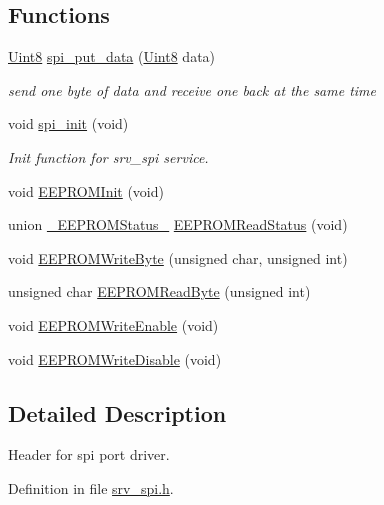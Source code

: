 \subsection*{Functions}
\begin{DoxyCompactItemize}
\item 
\hyperlink{a00070_af84840501dec18061d18a68c162a8fa2}{Uint8} \hyperlink{a00011_a19e2dff580e4d1b2198fa9108fca81ac}{spi\+\_\+put\+\_\+data} (\hyperlink{a00070_af84840501dec18061d18a68c162a8fa2}{Uint8} data)
\begin{DoxyCompactList}\small\item\em send one byte of data and receive one back at the same time \end{DoxyCompactList}\item 
void \hyperlink{a00011_ae909944aa85ae98323073c628be541aa}{spi\+\_\+init} (void)
\begin{DoxyCompactList}\small\item\em Init function for srv\+\_\+spi service. \end{DoxyCompactList}\item 
void \hyperlink{a00011_a507081b071417d4dacd038af0d0e4c25}{E\+E\+P\+R\+O\+M\+Init} (void)
\item 
union \hyperlink{a00011_db/db6/a00074}{\+\_\+\+E\+E\+P\+R\+O\+M\+Status\+\_\+} \hyperlink{a00011_a737bfe55bdc73b84f3fd5565c6baca2a}{E\+E\+P\+R\+O\+M\+Read\+Status} (void)
\item 
void \hyperlink{a00011_ab651dc76a73eff7c347344cc8b5b0b21}{E\+E\+P\+R\+O\+M\+Write\+Byte} (unsigned char, unsigned int)
\item 
unsigned char \hyperlink{a00011_a35883bb981f7b74f38bed25512568081}{E\+E\+P\+R\+O\+M\+Read\+Byte} (unsigned int)
\item 
void \hyperlink{a00011_a615f233da8f99248295e6ea727d93bde}{E\+E\+P\+R\+O\+M\+Write\+Enable} (void)
\item 
void \hyperlink{a00011_a985b143808edb68aca9c4dabc7af959d}{E\+E\+P\+R\+O\+M\+Write\+Disable} (void)
\end{DoxyCompactItemize}


\subsection{Detailed Description}
Header for spi port driver. 



Definition in file \hyperlink{a00011_source}{srv\+\_\+spi.\+h}.



